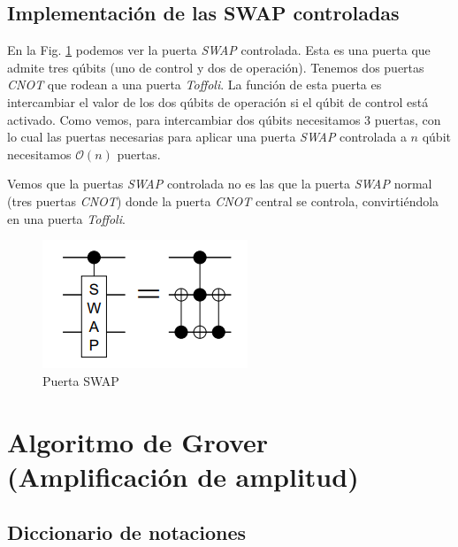 \documentclass[a4paper,11pt]{book} %
\numberwithin{equation}{chapter}
\begin{document}
\section{Implementación de las SWAP controladas}


En la Fig. \ref{Fig_2n+3_swap} podemos ver la puerta \textit{SWAP} controlada. Esta es una puerta que admite tres qúbits (uno de control y dos de operación). Tenemos dos puertas \textit{CNOT} que rodean a una puerta \textit{Toffoli}. La función de esta puerta es intercambiar el valor de los dos qúbits de operación si el qúbit de control está activado. Como vemos, para intercambiar dos qúbits necesitamos 3 puertas, con lo cual las puertas necesarias para aplicar una puerta \textit{SWAP} controlada a $n$ qúbit necesitamos $\mathcal{O}(n)$ puertas.

Vemos que la puertas \textit{SWAP} controlada no es las que la puerta \textit{SWAP} normal (tres puertas \textit{CNOT}) donde la puerta \textit{CNOT} central se controla, convirtiéndola en una puerta \textit{Toffoli}. 

\begin{figure}[h]
\centering 
\includegraphics[width=0.3\linewidth]{Figuras/Fig-swap.PNG}
\caption{Puerta SWAP}
\label{Fig_2n+3_swap}
\end{figure}







\chapter{Algoritmo de Grover (Amplificación de amplitud)} \label{sec_chapter_Grover}



\section*{Diccionario de notaciones}
\end{document}
